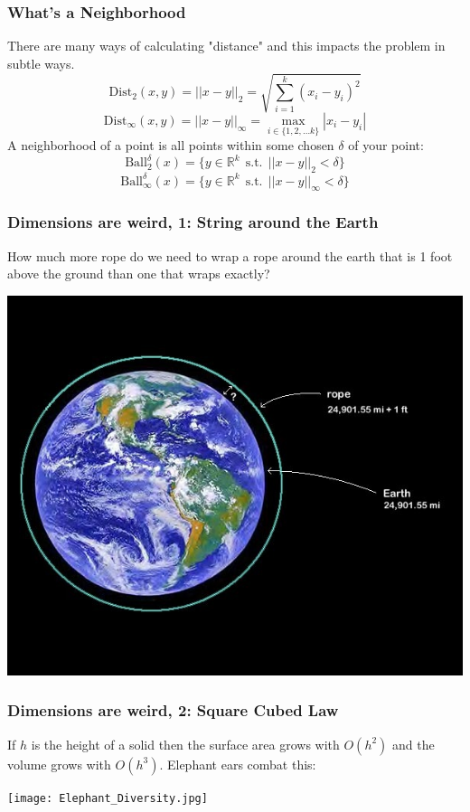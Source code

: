 \documentclass{beamer}
\begin{document}
\begin{frame}
    \frametitle{What's a Neighborhood}
    There are many ways of calculating "distance" and this impacts the problem in subtle ways.
    $$\text{Dist}_2(x, y) = ||x - y||_2 = \sqrt{ \sum_{i=1}^{k} (x_i - y_i)^2}$$  
    $$\text{Dist}_\infty(x, y) = ||x - y||_\infty = \max_{{i \in \{1, 2, \dots k\}}} |x_i - y_i| $$
    A neighborhood of a point is all points within some chosen $\delta$ of your point:
    $$\text{Ball}_2^\delta(x) = \lbrace y \in \mathbb{R}^k ~~ \text{s.t.} ~~ ||x-y||_2 < \delta \rbrace $$  
    $$\text{Ball}_\infty^\delta(x) = \lbrace y \in \mathbb{R}^k ~~ \text{s.t.} ~~ ||x-y||_\infty < \delta \rbrace $$  

\end{frame}

\begin{frame}
    \frametitle{Dimensions are weird, 1: String around the Earth}
    How much more rope do we need to wrap a rope around the earth that is 1 foot above the ground than one that wraps exactly?
    \begin{center}
    \includegraphics[scale=0.4]{Rope_around_earth_3.jpg}
    \end{center}
\end{frame}

\begin{frame}
    \frametitle{Dimensions are weird, 2: Square Cubed Law}
    If $h$ is the height of a solid then the surface area grows with $O(h^2)$ and the volume grows with $O(h^3)$. Elephant ears combat this:
    \begin{center}
    \texttt{[image: Elephant\_Diversity.jpg]}
    \end{center}
\end{frame}
\end{document}
